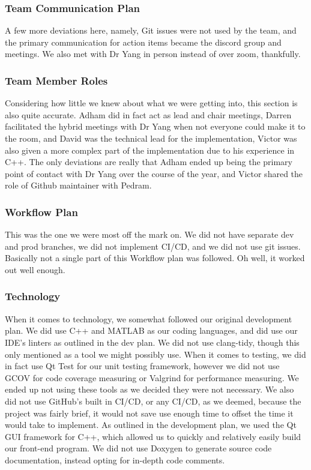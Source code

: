 \documentclass{article}
\begin{document}
\subsubsection{Team Communication Plan}
A few  more deviations here, namely, Git issues were not used by the team, and the primary communication for action items became the discord group and meetings.
We also met with Dr Yang in person instead of over zoom, thankfully.
\subsubsection{Team Member Roles}
Considering how little we knew about what we were getting into, this section is also quite accurate. Adham did in fact act as lead and chair meetings, Darren facilitated the
hybrid meetings with Dr Yang when not everyone could make it to the room, and David was the technical lead for the implementation, Victor was also given a more complex part
of the implementation due to his experience in C++. The only deviations are really that Adham ended up being the primary point of contact with Dr Yang over the course of the
year, and Victor shared the role of Github maintainer with Pedram.

\subsubsection{Workflow Plan}
This was the one we were most off the mark on. We did not have separate dev and prod branches, we did not implement CI/CD, and we did not use git issues. Basically not a single
part of this Workflow plan was followed. Oh well, it worked out well enough.


\subsubsection{Technology}
When it comes to technology, we somewhat followed our original development plan. We did use C++ and MATLAB as our coding languages, 
and did use our IDE's linters as outlined in the dev plan. We did not use clang-tidy, though this only mentioned as a tool we might possibly use. 
When it comes to testing, we did in fact use Qt Test for our unit testing framework, however we did not use GCOV for code coverage measuring or Valgrind 
for performance measuring. We ended up not using these tools as we decided they were not necessary. We also did not use GitHub's built in CI/CD, or any CI/CD, 
as we deemed, because the project was fairly brief, it would not save use enough time to offset the time it would take to implement. As outlined in the development plan, 
we used the Qt GUI framework for C++, which allowed us to quickly and relatively easily build our front-end program. We did not use Doxygen to generate source code 
documentation, instead opting for in-depth code comments.
\end{document}
